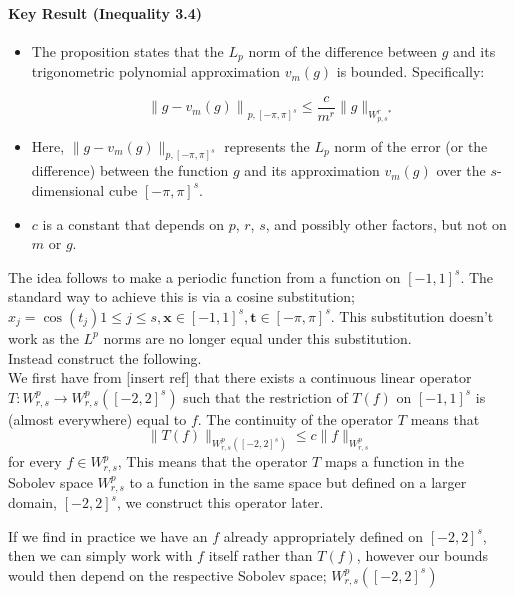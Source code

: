 \documentclass{article}
\begin{document}
\paragraph*{Key Result (Inequality 3.4)}

\begin{itemize}
    \item  The proposition states that the \( L_p \) norm of the difference between \( g \) and its trigonometric polynomial approximation \( v_m(g) \) is bounded. Specifically:

    \setcounter{equation}{1} 
    \begin{equation}
        \left\|g - v_m(g)\right\|_{p, [-\pi,\pi]^s} \leq \frac{c}{m^r} \|g\|_{W^r_{p, s}^*}
    \end{equation}

    \item  Here, \( \|g - v_m(g)\|_{p, [-\pi,\pi]^s} \) represents the \( L_p \) norm of the error (or the difference) between the function \( g \) and its approximation \( v_m(g) \) over the \( s \)-dimensional cube \( [-\pi, \pi]^s \).
    \item \( c \) is a constant that depends on \( p \), \( r \), \( s \), and possibly other factors, but not on \( m \) or \( g \).
\end{itemize}

The idea follows to make a periodic function from a function on \([-1,1]^s\). The standard way to achieve this is via a cosine substitution; \(x_{j} = \cos (t_{j}) 1 \leq j \leq s, \mathbf{x} \in [-1,1]^s, \mathbf{t} \in [-\pi ,\pi ]^s\). This substitution doesn't work as the \(L^p\) norms are no longer equal under this substitution.\\

Instead construct the following.\\
We first have from [insert ref] that there exists a continuous linear operator \( T: W_{r,s}^{p} \to W_{r,s}^{p}([-2,2]^s) \) such that the restriction of \( T(f) \) on \( [-1,1]^s \) is (almost everywhere) equal to \( f \). The continuity of the operator \( T \) means that
\[
    \|T(f)\|_{W_{r,s}^{p}([-2,2]^s)} \leq c \|f\|_{W_{r,s}^{p}}  
\]
for every \(f \in W_{r,s}^{p}\), This means that the operator \( T \) maps a function in the Sobolev space \( W_{r,s}^{p} \) to a function in the same space but defined on a larger domain, \( [-2, 2]^s \), we construct this operator later.

If we find in practice we have an \(f\) already appropriately defined on \([-2,2]^s\), then we can simply work with \(f\) itself rather than \(T(f)\), however our bounds would then depend on the respective Sobolev space; \(W_{r,s}^{p}([-2,2]^s)\) \\
\end{document}
